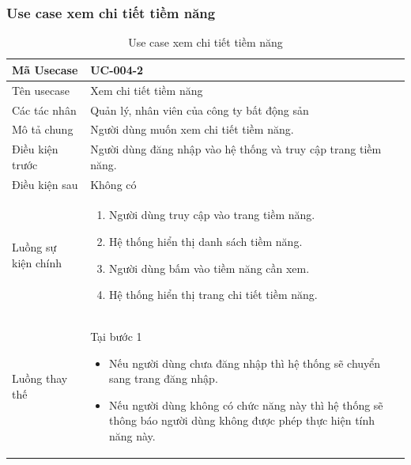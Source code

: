 \documentclass[12pt,a4paper]{article}
\begin{document}
    \subsubsection*{Use case xem chi tiết tiềm năng }
    \begin{table}[H]
        \centering
        \begin{tabular}{|p{3.5cm}|p{11.5cm}|c|}
            \hline
            Mã Usecase      & UC-004-2                                                       \\
            \hline
            Tên usecase     & Xem chi tiết tiềm năng                                         \\
            \hline
            Các tác nhân    & Quản lý, nhân viên của công ty bất động sản                    \\
            \hline
            Mô tả chung     & Người dùng muốn xem chi tiết tiềm năng.                        \\
            \hline
            Điều kiện trước & Người dùng đăng nhập vào hệ thống và truy cập trang tiềm năng. \\
            \hline
            Điều kiện sau   & Không có                                                       \\
            \hline
            Luồng sự kiện chính & \vspace{-.8cm}\begin{enumerate}
                                                    \item Người dùng truy cập vào trang tiềm năng.
                                                    \item Hệ thống hiển thị danh sách tiềm năng.
                                                    \item Người dùng bấm vào tiềm năng cần xem.
                                                    \item Hệ thống hiển thị trang chi tiết tiềm năng.
            \end{enumerate}
            \\
            \hline
            Luồng thay thế & Tại bước 1\newline
            \vspace{-.8cm}\begin{itemize}
                              \item Nếu người dùng chưa đăng nhập thì hệ thống sẽ chuyển sang trang đăng nhập.
                              \item  Nếu người dùng không có chức năng này thì hệ thống sẽ thông báo người dùng không được phép thực hiện tính năng này.
            \end{itemize}

            \\    \hline
        \end{tabular}
        \caption{Use case xem chi tiết tiềm năng }
    \end{table}
\end{document}
